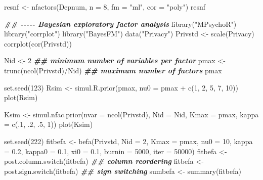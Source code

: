 \documentclass[
]{book}
\newenvironment{Shaded}{\begin{snugshade}}{\end{snugshade}}
\newcommand{\AttributeTok}[1]{\textcolor[rgb]{0.77,0.63,0.00}{#1}}
\newcommand{\DecValTok}[1]{\textcolor[rgb]{0.00,0.00,0.81}{#1}}
\newcommand{\DocumentationTok}[1]{\textcolor[rgb]{0.56,0.35,0.01}{\textbf{\textit{#1}}}}
\newcommand{\FloatTok}[1]{\textcolor[rgb]{0.00,0.00,0.81}{#1}}
\newcommand{\FunctionTok}[1]{\textcolor[rgb]{0.00,0.00,0.00}{#1}}
\newcommand{\NormalTok}[1]{#1}
\newcommand{\OtherTok}[1]{\textcolor[rgb]{0.56,0.35,0.01}{#1}}
\newcommand{\SpecialCharTok}[1]{\textcolor[rgb]{0.00,0.00,0.00}{#1}}
\newcommand{\StringTok}[1]{\textcolor[rgb]{0.31,0.60,0.02}{#1}}
\begin{document}
\begin{Shaded}
\begin{Highlighting}[]
\NormalTok{resnf }\OtherTok{\textless{}{-}} \FunctionTok{nfactors}\NormalTok{(Depnum, }\AttributeTok{n =} \DecValTok{8}\NormalTok{, }\AttributeTok{fm =} \StringTok{"ml"}\NormalTok{, }\AttributeTok{cor =} \StringTok{"poly"}\NormalTok{)}
\NormalTok{resnf}

\DocumentationTok{\#\# {-}{-}{-}{-}{-} Bayesian exploratory factor analysis}
\FunctionTok{library}\NormalTok{(}\StringTok{"MPsychoR"}\NormalTok{)}
\FunctionTok{library}\NormalTok{(}\StringTok{"corrplot"}\NormalTok{)}
\FunctionTok{library}\NormalTok{(}\StringTok{"BayesFM"}\NormalTok{)}
\FunctionTok{data}\NormalTok{(}\StringTok{"Privacy"}\NormalTok{)}
\NormalTok{Privstd }\OtherTok{\textless{}{-}} \FunctionTok{scale}\NormalTok{(Privacy)}
\FunctionTok{corrplot}\NormalTok{(}\FunctionTok{cor}\NormalTok{(Privstd))}

\NormalTok{Nid }\OtherTok{\textless{}{-}} \DecValTok{2}              \DocumentationTok{\#\# minimum number of variables per factor}
\NormalTok{pmax }\OtherTok{\textless{}{-}} \FunctionTok{trunc}\NormalTok{(}\FunctionTok{ncol}\NormalTok{(Privstd)}\SpecialCharTok{/}\NormalTok{Nid)   }\DocumentationTok{\#\# maximum number of factors}
\NormalTok{pmax}

\FunctionTok{set.seed}\NormalTok{(}\DecValTok{123}\NormalTok{)}
\NormalTok{Rsim }\OtherTok{\textless{}{-}} \FunctionTok{simul.R.prior}\NormalTok{(pmax, }\AttributeTok{nu0 =}\NormalTok{ pmax }\SpecialCharTok{+} \FunctionTok{c}\NormalTok{(}\DecValTok{1}\NormalTok{, }\DecValTok{2}\NormalTok{, }\DecValTok{5}\NormalTok{, }\DecValTok{7}\NormalTok{, }\DecValTok{10}\NormalTok{))}
\FunctionTok{plot}\NormalTok{(Rsim)}

\NormalTok{Ksim }\OtherTok{\textless{}{-}} \FunctionTok{simul.nfac.prior}\NormalTok{(}\AttributeTok{nvar =} \FunctionTok{ncol}\NormalTok{(Privstd), }\AttributeTok{Nid =}\NormalTok{ Nid, }\AttributeTok{Kmax =}\NormalTok{ pmax, }\AttributeTok{kappa =} \FunctionTok{c}\NormalTok{(.}\DecValTok{1}\NormalTok{, .}\DecValTok{2}\NormalTok{, .}\DecValTok{5}\NormalTok{, }\DecValTok{1}\NormalTok{))}
\FunctionTok{plot}\NormalTok{(Ksim)}

\FunctionTok{set.seed}\NormalTok{(}\DecValTok{222}\NormalTok{)}
\NormalTok{fitbefa }\OtherTok{\textless{}{-}} \FunctionTok{befa}\NormalTok{(Privstd, }\AttributeTok{Nid =} \DecValTok{2}\NormalTok{, }\AttributeTok{Kmax =}\NormalTok{ pmax, }\AttributeTok{nu0 =} \DecValTok{10}\NormalTok{, }\AttributeTok{kappa =} \FloatTok{0.2}\NormalTok{, }\AttributeTok{kappa0 =} \FloatTok{0.1}\NormalTok{, }\AttributeTok{xi0 =} \FloatTok{0.1}\NormalTok{,}
                \AttributeTok{burnin =} \DecValTok{5000}\NormalTok{, }\AttributeTok{iter =} \DecValTok{50000}\NormalTok{)}
\NormalTok{fitbefa }\OtherTok{\textless{}{-}} \FunctionTok{post.column.switch}\NormalTok{(fitbefa)   }\DocumentationTok{\#\# column reordering}
\NormalTok{fitbefa }\OtherTok{\textless{}{-}} \FunctionTok{post.sign.switch}\NormalTok{(fitbefa)     }\DocumentationTok{\#\# sign switching}
\NormalTok{sumbefa }\OtherTok{\textless{}{-}} \FunctionTok{summary}\NormalTok{(fitbefa)}


\end{Highlighting}
\end{Shaded}
\end{document}
